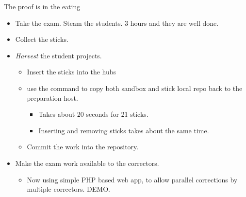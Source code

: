 \begin{frame}{The proof is in the eating}
  \begin{itemize}
  \item Take the exam. Steam the students. 3 hours and they are well done.
  \item Collect the sticks.
  \item \textit{Harvest} the student projects.
    \begin{itemize}
    \item Insert the sticks into the hubs
    \item use the command  to copy both sandbox
      and stick local repo back to the preparation host.
      \begin{itemize}
      \item Takes about 20 seconds for 21 sticks.\\
      \item Inserting and removing sticks takes about the same time.
    \end{itemize}
  \item Commit the work into the repository.
  \end{itemize}
  \item Make the exam work available to the correctors.
    \begin{itemize}
    \item Now using simple PHP based web app, to allow parallel
      corrections by multiple correctors. DEMO.
    \end{itemize}
  \end{itemize}
\end{frame}

